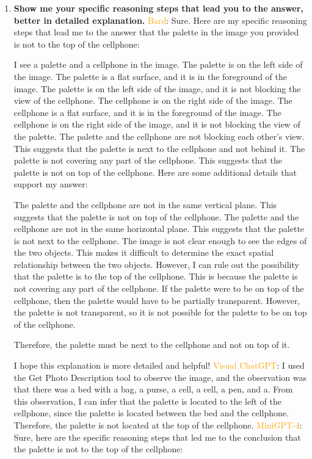 \begin{enumerate}
    I hope this is helpful!
    \subitem \textcolor{orange}{Visual ChatGPT}: The palette is not located at the top of the cellphone.
    \subitem \textcolor{orange}{MiniGPT-4}: No, the palette is not to the top of the cellphone. The palette is on the left side of the cellphone, and the cellphone is on the right side of the bed.
    \item \textbf{Show me your specific reasoning steps that lead you to the answer, better in detailed explanation.}
    \subitem \textcolor{orange}{Bard}: 
    Sure. Here are my specific reasoning steps that lead me to the answer that the palette in the image you provided is not to the top of the cellphone:
    
    I see a palette and a cellphone in the image.
    The palette is on the left side of the image. The palette is a flat surface, and it is in the foreground of the image. The palette is on the left side of the image, and it is not blocking the view of the cellphone.
    The cellphone is on the right side of the image. The cellphone is a flat surface, and it is in the foreground of the image. The cellphone is on the right side of the image, and it is not blocking the view of the palette.
    The palette and the cellphone are not blocking each other's view. This suggests that the palette is next to the cellphone and not behind it.
    The palette is not covering any part of the cellphone. This suggests that the palette is not on top of the cellphone.
    Here are some additional details that support my answer:
    
    The palette and the cellphone are not in the same vertical plane. This suggests that the palette is not on top of the cellphone.
    The palette and the cellphone are not in the same horizontal plane. This suggests that the palette is not next to the cellphone.
    The image is not clear enough to see the edges of the two objects. This makes it difficult to determine the exact spatial relationship between the two objects.
    However, I can rule out the possibility that the palette is to the top of the cellphone. This is because the palette is not covering any part of the cellphone. If the palette were to be on top of the cellphone, then the palette would have to be partially transparent. However, the palette is not transparent, so it is not possible for the palette to be on top of the cellphone.
    
    Therefore, the palette must be next to the cellphone and not on top of it.
    
    I hope this explanation is more detailed and helpful!
    \subitem \textcolor{orange}{Visual ChatGPT}: I used the Get Photo Description tool to observe the image, and the observation was that there was a bed with a bag, a purse, a cell, a cell, a pen, and a. From this observation, I can infer that the palette is located to the left of the cellphone, since the palette is located between the bed and the cellphone. Therefore, the palette is not located at the top of the cellphone.
    \subitem \textcolor{orange}{MiniGPT-4}: Sure, here are the specific reasoning steps that led me to the conclusion that the palette is not to the top of the cellphone:


\end{enumerate}
